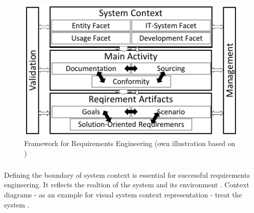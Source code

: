 \begin{figure}[H]
    \centering
    \includegraphics[scale=1.5]{img/ReqAnFrameWork.pdf}
    \caption[Framework for Requirements Engineering]{Framework for Requirements Engineering (own illustration based on \cite[41]{Pohl.2007})}
    \label{fig:reqFramework}
\end{figure}

\subparagraph{} \label{beginFacets} Defining the boundary of system context is essential for successful requirements engineering. It reflects the realtion of the system and its environment \parencite[55]{Pohl.2007}. Context diagrams - as an example for visual system context representation \parencites[cf.][266]{Kossiakoff.2011} - treat the system  \parencite[76]{Lauesen.2008}.

